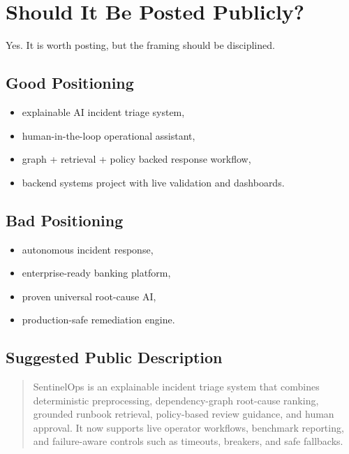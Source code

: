 \documentclass[11pt]{article}
\begin{document}
\section{Should It Be Posted Publicly?}
Yes. It is worth posting, but the framing should be disciplined.

\subsection{Good Positioning}
\begin{itemize}[leftmargin=*]
\item explainable AI incident triage system,
\item human-in-the-loop operational assistant,
\item graph + retrieval + policy backed response workflow,
\item backend systems project with live validation and dashboards.
\end{itemize}

\subsection{Bad Positioning}
\begin{itemize}[leftmargin=*]
\item autonomous incident response,
\item enterprise-ready banking platform,
\item proven universal root-cause AI,
\item production-safe remediation engine.
\end{itemize}

\subsection{Suggested Public Description}
\begin{quote}
SentinelOps is an explainable incident triage system that combines deterministic preprocessing, dependency-graph root-cause ranking, grounded runbook retrieval, policy-based review guidance, and human approval. It now supports live operator workflows, benchmark reporting, and failure-aware controls such as timeouts, breakers, and safe fallbacks.
\end{quote}
\end{document}
